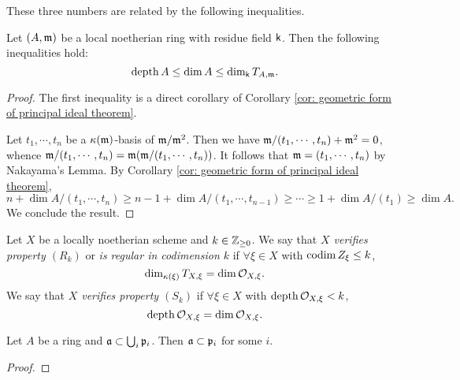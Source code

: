     These three numbers are related by the following inequalities.
    \begin{proposition}\label{prop: inequality of depth, dimension and dimension of tangent space}
        Let $(A,{\mathfrak{m}})$ be a local noetherian ring with residue field ${\mathsf{k}}$.
        Then the following inequalities hold:
        \[ \operatorname{depth} A \leq \dim A \leq \dim_{\mathsf{k}} T_{A,{\mathfrak{m}}}. \]
    \end{proposition}
    \begin{proof}
        The first inequality is a direct corollary of Corollary \ref{cor: geometric form of principal ideal theorem}.

        Let $t_1,\cdots,t_n$ be a ${\kappa}({\mathfrak{m}})$-basis of ${\mathfrak{m}}/{\mathfrak{m}}^2$.
        Then we have ${\mathfrak{m}}/(t_1,\cdots,t_n)+{\mathfrak{m}}^2 = 0$, whence ${\mathfrak{m}}/(t_1,\cdots,t_n) = {\mathfrak{m}}({\mathfrak{m}}/(t_1,\cdots,t_n))$.
        It follows that ${\mathfrak{m}} = (t_1,\cdots,t_n)$ by Nakayama's Lemma.
        By Corollary \ref{cor: geometric form of principal ideal theorem}, 
        \[ n + \dim A/(t_1,\cdots,t_n) \geq n-1 + \dim A/(t_1,\cdots,t_{n-1}) \geq \cdots \geq 1 + \dim A/(t_1) \geq \dim A. \]  
        We conclude the result.
    \end{proof}


    \begin{definition}\label{def: regular and Serre's conditions}
        Let $X$ be a locally noetherian scheme and $k \in {\mathbb{Z}}_{\geq 0}$.
        We say that \textit{$X$ verifies property $(R_k)$} or \textit{is regular in codimension $k$} if $\forall \xi \in X$ with $\operatorname{codim} Z_\xi \leq k$, 
        \[ \dim_{{\kappa}(\xi)} T_{X,\xi} = \dim {\mathcal{O}}_{X,\xi}. \]
        We say that \textit{$X$ verifies property $(S_k)$} if $\forall \xi \in X$ with $\operatorname{depth} {\mathcal{O}}_{X,\xi} < k$,
        \[ \operatorname{depth} {\mathcal{O}}_{X,\xi} = \dim {\mathcal{O}}_{X,\xi}. \]        
    \end{definition}

    \begin{lemma}\label{lem: trick lemma: subideal in union of prime belongs one}
        Let $A$ be a ring and ${\mathfrak{a}} \subset \bigcup_i {\mathfrak{p}}_i$.
        Then ${\mathfrak{a}} \subset {\mathfrak{p}}_i$ for some $i$.
    \end{lemma}
    \begin{proof}
    \end{proof}

